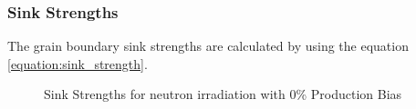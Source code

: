 \documentclass[a4paper]{article}
\begin{document}
    \newpage
    \subsubsection{Sink Strengths} \hspace{10pt}
    The grain boundary sink strengths are calculated by using the equation \ref{equation:sink_strength}.
      \begin{figure}[h!]  %
        \centering
        \qquad
        \caption{Sink Strengths for neutron irradiation with 0\% Production Bias}
        \label{figure:sink_strengths_neutron_0_1e-6}
      \end{figure}
\end{document}
